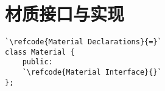 \section{材质接口与实现}\label{sec:材质接口与实现}

\label{code:overview_Material}
\begin{lstlisting}
`\refcode{Material Declarations}{=}`
class Material {
    public:
    `\refcode{Material Interface}{}`
};
\end{lstlisting}
